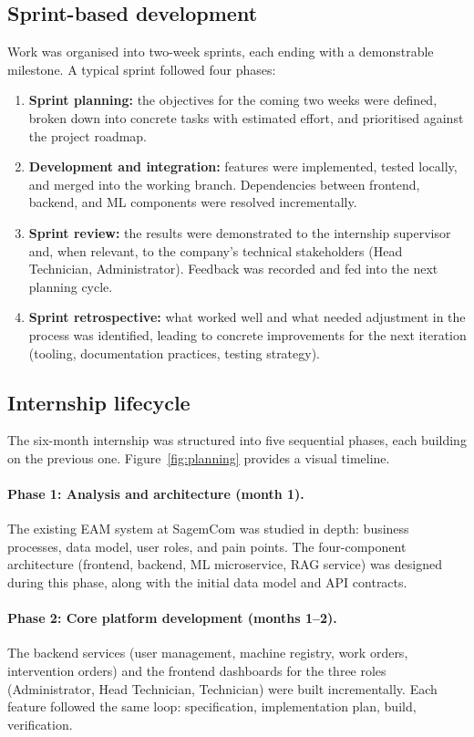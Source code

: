 \subsection{Sprint-based development}

Work was organised into two-week sprints, each ending with a demonstrable milestone. A typical sprint followed four phases:

\begin{enumerate}
\item \textbf{Sprint planning:} the objectives for the coming two weeks were defined, broken down into concrete tasks with estimated effort, and prioritised against the project roadmap.
\item \textbf{Development and integration:} features were implemented, tested locally, and merged into the working branch. Dependencies between frontend, backend, and ML components were resolved incrementally.
\item \textbf{Sprint review:} the results were demonstrated to the internship supervisor and, when relevant, to the company's technical stakeholders (Head Technician, Administrator). Feedback was recorded and fed into the next planning cycle.
\item \textbf{Sprint retrospective:} what worked well and what needed adjustment in the process was identified, leading to concrete improvements for the next iteration (tooling, documentation practices, testing strategy).
\end{enumerate}

\subsection{Internship lifecycle}

The six-month internship was structured into five sequential phases, each building on the previous one. Figure~\ref{fig:planning} provides a visual timeline.

\paragraph{Phase 1: Analysis and architecture (month 1).}
The existing EAM system at SagemCom was studied in depth: business processes, data model, user roles, and pain points. The four-component architecture (frontend, backend, ML microservice, RAG service) was designed during this phase, along with the initial data model and API contracts.

\paragraph{Phase 2: Core platform development (months 1--2).}
The backend services (user management, machine registry, work orders, intervention orders) and the frontend dashboards for the three roles (Administrator, Head Technician, Technician) were built incrementally. Each feature followed the same loop: specification, implementation plan, build, verification.

